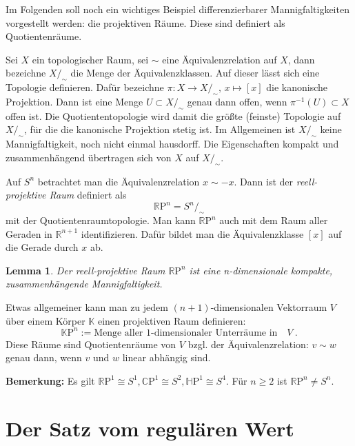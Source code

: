 \documentclass[12pt,a4paper]{article}
\def\R{\mathbb{R}}
\def\C{\mathbb{C}}
\def\H{\mathbb{H}}
\def\K{\mathbb{K}}
\newtheorem{Lemma}{Lemma}[section]
\begin{document}
\bigskip

Im Folgenden soll noch ein wichtiges Beispiel differenzierbarer Mannigfaltigkeiten vor\-gestellt werden:
die projektiven R\"aume. Diese sind definiert als Quotientenr\"aume.

\medskip

Sei $X$ ein topologischer Raum, sei $\sim$ eine \"Aquivalenzrelation auf $X$, dann bezeichne
$X/_\sim$ die Menge der \"Aquivalenzklassen. Auf dieser l\"asst sich eine Topologie definieren.
Daf\"ur bezeichne $\pi : X \rightarrow X/_\sim, \, x \mapsto [x]$ die kanonische Projektion. Dann ist
eine Menge $U \subset X/_\sim$ genau dann offen, wenn $\pi^{-1}(U)\subset X$ offen ist. Die
Quotiententopologie wird damit die gr\"o\ss te (feinste) Topologie auf $X/_\sim$, f\"ur die die kanonische
Projektion stetig ist. Im Allgemeinen ist $X/_\sim$ keine Mannigfaltigkeit, noch nicht einmal hausdorff.
Die Eigenschaften kompakt und zusammenh\"angend \"ubertragen sich von $X$ auf $X/_\sim$.

\medskip

Auf $S^n$ betrachtet man die \"Aquivalenzrelation $x \sim -x$. Dann ist der {\it reell-projektive Raum}
definiert als
$$
\R  {\mathrm P}^n = S^n/_\sim
$$
mit der Quotientenraumtopologie. Man kann $\R  {\mathrm P}^n$ auch mit dem Raum aller Geraden in $\R^{n+1}$
identifizieren. Daf\"ur bildet man die \"Aquivalenzklasse $[x]$ auf die Gerade durch $x$ ab.

\begin{Lemma}
Der reell-projektive Raum $\R  {\mathrm P}^n$ ist eine n-dimensionale kompakte, zusammenh\"angende Mannigfaltigkeit.
\end{Lemma}


Etwas allgemeiner kann man zu jedem $(n+1)$-dimensionalen Vektorraum $V$  \"uber einem K\"orper $\K$ einen projektiven Raum
definieren:
$$
\K {\mathrm P}^n := \mbox{Menge aller 1-dimensionaler Unterr\"aume in}\quad V \ .
$$
Diese R\"aume sind Quotientenr\"aume von $V$ bzgl. der \"Aquivalenzrelation: $v \sim w$ genau dann,
wenn $v$ und $w$ linear abh\"angig sind.

\bigskip

{\bf Bemerkung:} Es gilt $\R {\mathrm P}^1 \cong S^1, \C {\mathrm P}^1 \cong S^2, \H {\mathrm P}^1 \cong S^4 $. F\"ur $n\ge 2$ ist $\R {\mathrm P}^n \neq S^n$.




\section{Der Satz vom regul\"aren Wert}
\end{document}
